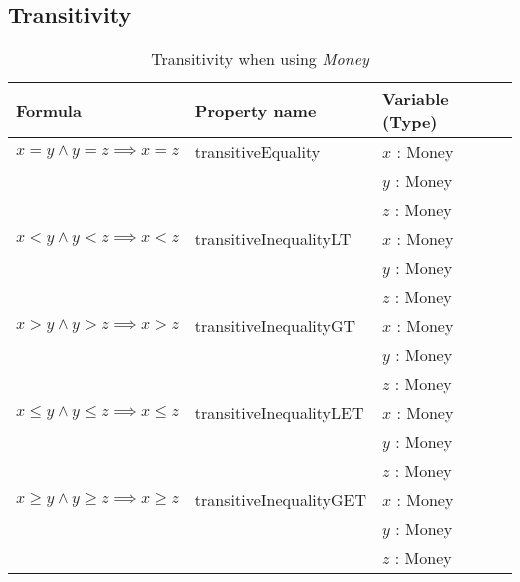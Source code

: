 \subsection*{Transitivity}
\label{ssct:properties_transitivity}
\begin{table}[!ht]
\centering
\begin{tabular}{lll}
\hline
                         \textbf{Formula}                                  & \textbf{Property name}  & \textbf{Variable (Type)} \\ \hline
\rowcolor[HTML]{EFEFEF}  $x = y \land y = z \implies x = z$ & transitiveEquality      & $x$ : Money              \\
\rowcolor[HTML]{EFEFEF}                                                    &                         & $y$ : Money              \\
\rowcolor[HTML]{EFEFEF}                                                    &                         & $z$ : Money              \\
                         $x < y \land y < z \implies x < z$                & transitiveInequalityLT  & $x$ : Money              \\
                                                                           &                         & $y$ : Money              \\
                                                                           &                         & $z$ : Money              \\
\rowcolor[HTML]{EFEFEF}  $x > y \land y > z \implies x > z$                & transitiveInequalityGT  & $x$ : Money              \\
\rowcolor[HTML]{EFEFEF}                                                    &                         & $y$ : Money              \\
\rowcolor[HTML]{EFEFEF}                                                    &                         & $z$ : Money              \\
                         $x \leq y \land y \leq z \implies x \leq z$       & transitiveInequalityLET & $x$ : Money              \\
                                                                           &                         & $y$ : Money              \\
                                                                           &                         & $z$ : Money              \\
\rowcolor[HTML]{EFEFEF}  $x \geq y \land y \geq z \implies x \geq z$       & transitiveInequalityGET & $x$ : Money              \\
\rowcolor[HTML]{EFEFEF}                                                    &                         & $y$ : Money              \\
\rowcolor[HTML]{EFEFEF}                                                    &                         & $z$ : Money              \\ \hline
\end{tabular}
\caption{Transitivity when using \textit{Money}}
\label{tbl:ch4_money_transitivity}
\end{table}
